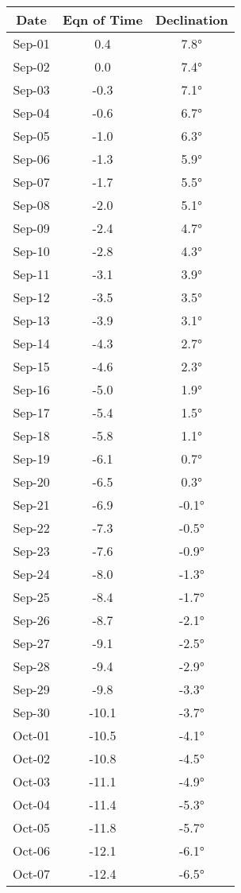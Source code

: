 \begin{footnotesize}
\begin{minipage}{0.33\textwidth}
\begin{tabular}[t]{c | c | c}
Date&Eqn of Time&Declination\\\hline
Sep-01 & 0.4 & 7.8°\\\hline
Sep-02 & 0.0 & 7.4°\\\hline
Sep-03 & -0.3 & 7.1°\\\hline
Sep-04 & -0.6 & 6.7°\\\hline
Sep-05 & -1.0 & 6.3°\\\hline
Sep-06 & -1.3 & 5.9°\\\hline
Sep-07 & -1.7 & 5.5°\\\hline
Sep-08 & -2.0 & 5.1°\\\hline
Sep-09 & -2.4 & 4.7°\\\hline
Sep-10 & -2.8 & 4.3°\\\hline
Sep-11 & -3.1 & 3.9°\\\hline
Sep-12 & -3.5 & 3.5°\\\hline
Sep-13 & -3.9 & 3.1°\\\hline
Sep-14 & -4.3 & 2.7°\\\hline
Sep-15 & -4.6 & 2.3°\\\hline
Sep-16 & -5.0 & 1.9°\\\hline
Sep-17 & -5.4 & 1.5°\\\hline
Sep-18 & -5.8 & 1.1°\\\hline
Sep-19 & -6.1 & 0.7°\\\hline
Sep-20 & -6.5 & 0.3°\\\hline
Sep-21 & -6.9 & -0.1°\\\hline
Sep-22 & -7.3 & -0.5°\\\hline
Sep-23 & -7.6 & -0.9°\\\hline
Sep-24 & -8.0 & -1.3°\\\hline
Sep-25 & -8.4 & -1.7°\\\hline
Sep-26 & -8.7 & -2.1°\\\hline
Sep-27 & -9.1 & -2.5°\\\hline
Sep-28 & -9.4 & -2.9°\\\hline
Sep-29 & -9.8 & -3.3°\\\hline
Sep-30 & -10.1 & -3.7°\\\hline
Oct-01 & -10.5 & -4.1°\\\hline
Oct-02 & -10.8 & -4.5°\\\hline
Oct-03 & -11.1 & -4.9°\\\hline
Oct-04 & -11.4 & -5.3°\\\hline
Oct-05 & -11.8 & -5.7°\\\hline
Oct-06 & -12.1 & -6.1°\\\hline
Oct-07 & -12.4 & -6.5°\\\hline

\end{tabular}
\end{minipage}
\end{footnotesize}
